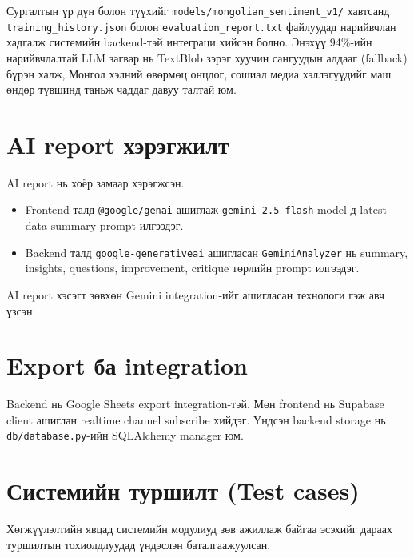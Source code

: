 \documentclass[
12pt,
oneside,
english,
onehalfspacing,
nolistspacing,
headsepline,
]{MUST-Thesis}
\begin{document}
Сургалтын үр дүн болон түүхийг \texttt{models/mongolian\_sentiment\_v1/} хавтсанд \texttt{training\_history.json} болон \texttt{evaluation\_report.txt} файлуудад нарийвчлан хадгалж системийн backend-тэй интеграци хийсэн болно. Энэхүү 94\%-ийн нарийвчлалтай LLM загвар нь TextBlob зэрэг хуучин сангуудын алдааг (fallback) бүрэн халж, Монгол хэлний өвөрмөц онцлог, сошиал медиа хэллэгүүдийг маш өндөр түвшинд таньж чаддаг давуу талтай юм.

\section{AI report хэрэгжилт}

AI report нь хоёр замаар хэрэгжсэн.

\begin{itemize}
    \item Frontend талд \texttt{@google/genai} ашиглаж \texttt{gemini-2.5-flash} model-д latest data summary prompt илгээдэг.
    \item Backend талд \texttt{google-generativeai} ашигласан \texttt{GeminiAnalyzer} нь summary, insights, questions, improvement, critique төрлийн prompt илгээдэг.
\end{itemize}

AI report хэсэгт зөвхөн Gemini integration-ийг ашигласан технологи гэж авч үзсэн.

\section{Export ба integration}

Backend нь Google Sheets export integration-тэй. Мөн frontend нь Supabase client ашиглан realtime channel subscribe хийдэг. Үндсэн backend storage нь \texttt{db/database.py}-ийн SQLAlchemy manager юм.

\section{Системийн туршилт (Test cases)}
Хөгжүүлэлтийн явцад системийн модулиуд зөв ажиллаж байгаа эсэхийг дараах туршилтын тохиолдлуудад үндэслэн баталгаажуулсан.
\end{document}
